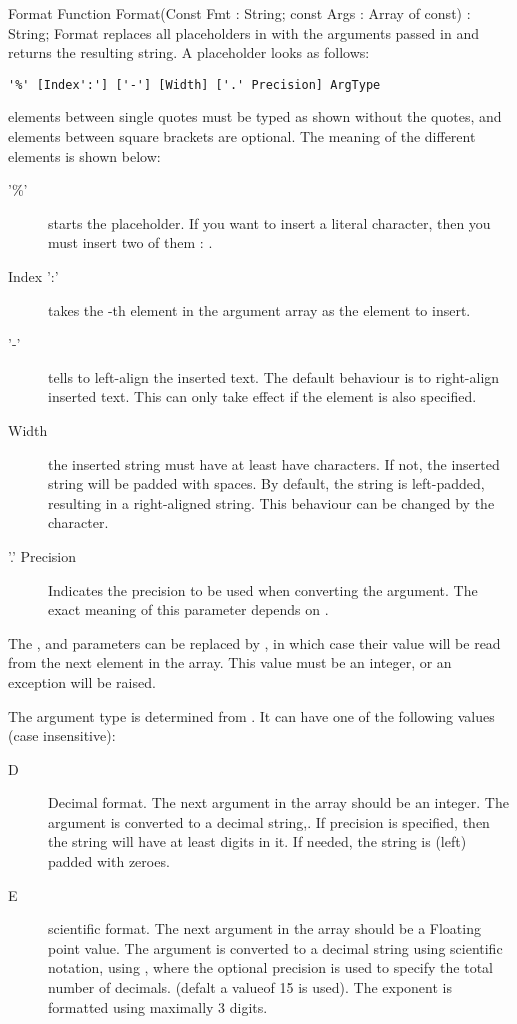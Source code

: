 \begin{function}{Format}
\Declaration
Function Format(Const Fmt : String; const Args : Array of const) : String;
\Description
Format replaces all placeholders in with the arguments passed in
 and returns the resulting string. A placeholder looks as follows:
\begin{verbatim}
'%' [Index':'] ['-'] [Width] ['.' Precision] ArgType
\end{verbatim}
elements between single quotes must be typed as shown without the quotes,
and elements between square brackets \var{[ ]} are optional. The meaning 
of the different elements is shown below:
\begin{description}
\item['\%'] starts the placeholder. If you want to insert a literal
\var{\%} character, then you must insert two of them : \var{\%\%}.
\item[Index ':'] takes the -th element in the argument array 
as the element to insert.
\item['-'] tells  to left-align the inserted text. The default
behaviour is to right-align inserted text. This can only take effect if the
 element is also specified.
\item[Width] the inserted string must have at least have 
characters. If not, the inserted string will be padded with spaces. By
default, the string is left-padded, resulting in a right-aligned string.
This behaviour can be changed by the  character.
\item['.' Precision] Indicates the precision to be used when converting
the argument. The exact meaning of this parameter depends on .
\end{description}
The ,  and  parameters can be replaced
by \var{*}, in which case their value will be read from the next element in
the  array. This value must be an integer, or an
 exception will be raised.

The argument type is determined from . It can have one of the
following values (case insensitive):
\begin{description}
\item[D] Decimal format. The next argument in the  array should be
an integer. The argument is converted to a decimal string,. If precision is
specified, then the string will have at least  digits in it.
If needed, the string is (left) padded with zeroes.
\item[E] scientific format. The next argument in the  array should
be a Floating point value. The argument is converted to a decimal string
using scientific notation, using , where the optional
precision is used to specify the total number of decimals. (defalt a valueof
15 is used). The exponent is formatted using maximally 3 digits.


\end{description}
\end{function}
